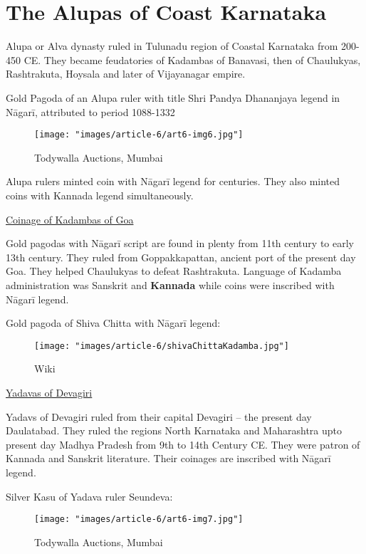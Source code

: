 \section*{The Alupas of Coast Karnataka}

Alupa or Alva dynasty ruled in Tulunadu region of Coastal Karnataka from 200-450 CE. They became feudatories of Kadambas of Banavasi, then of Chaulukyas, Rashtrakuta, Hoysala and later of Vijayanagar empire.

Gold Pagoda of an Alupa ruler with title Shri Pandya Dhananjaya legend in Nāgarī, attributed to period 1088-1332

\begin{figure}
\texttt{[image: "images/article-6/art6-img6.jpg"]}
\caption{Todywalla Auctions, Mumbai}
\end{figure}

Alupa rulers minted coin with Nāgarī legend for centuries. They also minted coins with Kannada legend simultaneously.

\underline{Coinage of Kadambas of Goa}

Gold pagodas with Nāgarī script are found in plenty from 11th century to early 13th century. They ruled from Goppakkapattan, ancient port of the present day Goa. They helped Chaulukyas to defeat Rashtrakuta. Language of Kadamba administration was Sanskrit and \textbf{Kannada} while coins were inscribed with Nāgarī legend.

Gold pagoda of Shiva Chitta with Nāgarī legend:

\begin{figure}
\texttt{[image: "images/article-6/shivaChittaKadamba.jpg"]}
\caption{Wiki}
\end{figure}

\underline{Yadavas of Devagiri}

Yadavs of Devagiri ruled from their capital Devagiri – the present day Daulatabad. They ruled the regions North Karnataka and Maharashtra upto present day Madhya Pradesh from 9th to 14th Century CE. They were patron of Kannada and Sanskrit literature. Their coinages are inscribed with Nāgarī legend.

Silver Kasu of Yadava ruler Seundeva:

\begin{figure}
\texttt{[image: "images/article-6/art6-img7.jpg"]}
\caption{Todywalla Auctions, Mumbai}
\end{figure}

